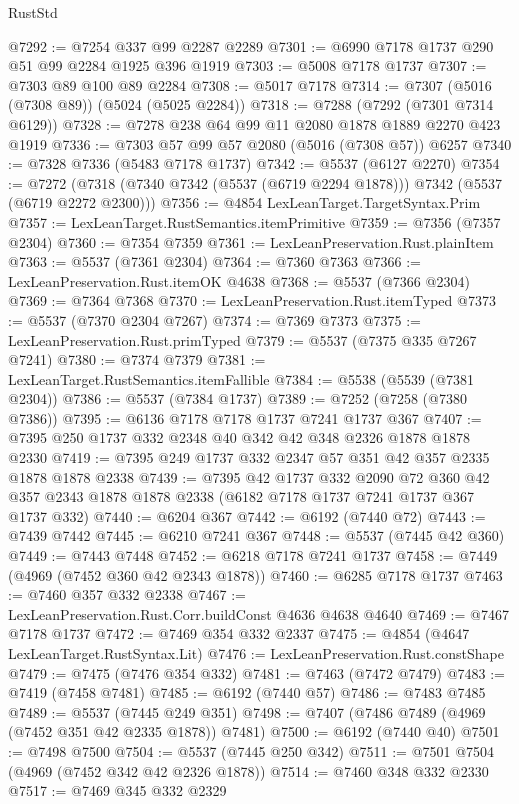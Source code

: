 \begin{lexlean}{RustStd}
\begin{coremodule}
@7292 := @7254 @337 @99 @2287 @2289
@7301 := @6990 @7178 @1737 @290 @51 @99 @2284 @1925 @396 @1919
@7303 := @5008 @7178 @1737
@7307 := @7303 @89 @100 @89 @2284
@7308 := @5017 @7178
@7314 := @7307 (@5016 (@7308 @89)) (@5024 (@5025 @2284))
@7318 := @7288 (@7292 (@7301 @7314 @6129))
@7328 := @7278 @238 @64 @99 @11 @2080 @1878 @1889 @2270 @423 @1919
@7336 := @7303 @57 @99 @57 @2080 (@5016 (@7308 @57)) @6257
@7340 := @7328 @7336 (@5483 @7178 @1737)
@7342 := @5537 (@6127 @2270)
@7354 := @7272 (@7318 (@7340 @7342 (@5537 (@6719 @2294 @1878))) @7342 (@5537 (@6719 @2272 @2300)))
@7356 := @4854 LexLeanTarget.TargetSyntax.Prim
@7357 := LexLeanTarget.RustSemantics.itemPrimitive
@7359 := @7356 (@7357 @2304)
@7360 := @7354 @7359
@7361 := LexLeanPreservation.Rust.plainItem
@7363 := @5537 (@7361 @2304)
@7364 := @7360 @7363
@7366 := LexLeanPreservation.Rust.itemOK @4638
@7368 := @5537 (@7366 @2304)
@7369 := @7364 @7368
@7370 := LexLeanPreservation.Rust.itemTyped
@7373 := @5537 (@7370 @2304 @7267)
@7374 := @7369 @7373
@7375 := LexLeanPreservation.Rust.primTyped
@7379 := @5537 (@7375 @335 @7267 @7241)
@7380 := @7374 @7379
@7381 := LexLeanTarget.RustSemantics.itemFallible
@7384 := @5538 (@5539 (@7381 @2304))
@7386 := @5537 (@7384 @1737)
@7389 := @7252 (@7258 (@7380 @7386))
@7395 := @6136 @7178 @7178 @1737 @7241 @1737 @367
@7407 := @7395 @250 @1737 @332 @2348 @40 @342 @42 @348 @2326 @1878 @1878 @2330
@7419 := @7395 @249 @1737 @332 @2347 @57 @351 @42 @357 @2335 @1878 @1878 @2338
@7439 := @7395
    @42
    @1737
    @332
    @2090
    @72
    @360
    @42
    @357
    @2343
    @1878
    @1878
    @2338
    (@6182 @7178 @1737 @7241 @1737 @367 @1737 @332)
@7440 := @6204 @367
@7442 := @6192 (@7440 @72)
@7443 := @7439 @7442
@7445 := @6210 @7241 @367
@7448 := @5537 (@7445 @42 @360)
@7449 := @7443 @7448
@7452 := @6218 @7178 @7241 @1737
@7458 := @7449 (@4969 (@7452 @360 @42 @2343 @1878))
@7460 := @6285 @7178 @1737
@7463 := @7460 @357 @332 @2338
@7467 := LexLeanPreservation.Rust.Corr.buildConst @4636 @4638 @4640
@7469 := @7467 @7178 @1737
@7472 := @7469 @354 @332 @2337
@7475 := @4854 (@4647 LexLeanTarget.RustSyntax.Lit)
@7476 := LexLeanPreservation.Rust.constShape
@7479 := @7475 (@7476 @354 @332)
@7481 := @7463 (@7472 @7479)
@7483 := @7419 (@7458 @7481)
@7485 := @6192 (@7440 @57)
@7486 := @7483 @7485
@7489 := @5537 (@7445 @249 @351)
@7498 := @7407 (@7486 @7489 (@4969 (@7452 @351 @42 @2335 @1878)) @7481)
@7500 := @6192 (@7440 @40)
@7501 := @7498 @7500
@7504 := @5537 (@7445 @250 @342)
@7511 := @7501 @7504 (@4969 (@7452 @342 @42 @2326 @1878))
@7514 := @7460 @348 @332 @2330
@7517 := @7469 @345 @332 @2329

\end{coremodule}
\end{lexlean}

